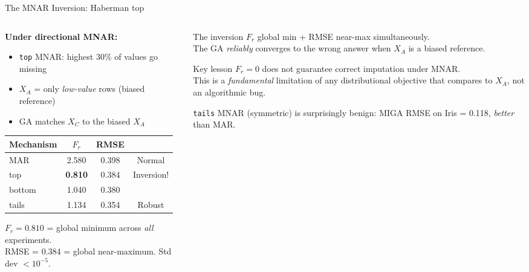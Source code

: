 \documentclass[aspectratio=169,12pt]{beamer}
\newcommand{\MIGA}{\textsc{MIGA}}
\begin{document}
\begin{frame}{The MNAR Inversion: Haberman top}

\begin{columns}
\begin{column}{0.55\textwidth}
\textbf{Under directional MNAR:}
\begin{itemize}
  \item \texttt{top} MNAR: highest 30\% of values go missing
  \item $X_A$ = only \emph{low-value} rows (biased reference)
  \item GA matches $X_C$ to the biased $X_A$
\end{itemize}

\bigskip
\renewcommand{\arraystretch}{1.3}
\begin{tabular}{lccc}
\toprule
Mechanism & $F_r$ & RMSE & \\
\midrule
MAR   & 2.580 & 0.398 & Normal \\
\alert{top}   & \alert{\textbf{0.810}} & \alert{0.384} & \alert{Inversion!} \\
bottom & 1.040 & 0.380 & \\
tails  & 1.134 & 0.354 & Robust \\
\bottomrule
\end{tabular}

\bigskip
{\small $F_r = 0.810$ = global minimum across \emph{all} experiments.\\
RMSE = 0.384 = global near-maximum. Std dev $< 10^{-5}$.}
\end{column}

\begin{column}{0.42\textwidth}
\begin{alertblock}{The inversion}
$F_r$ global min + RMSE near-max simultaneously.\\[6pt]
The GA \emph{reliably} converges to the wrong answer when $X_A$ is a biased reference.
\end{alertblock}

\bigskip
\begin{block}{Key lesson}
$F_r = 0$ does not guarantee correct imputation under MNAR.\\[4pt]
This is a \emph{fundamental} limitation of any distributional objective that compares to $X_A$, not an algorithmic bug.
\end{block}

\bigskip
{\small \texttt{tails} MNAR (symmetric) is surprisingly benign: \MIGA{} RMSE on Iris = 0.118, \emph{better} than MAR.}
\end{column}
\end{columns}

\end{frame}
\end{document}
